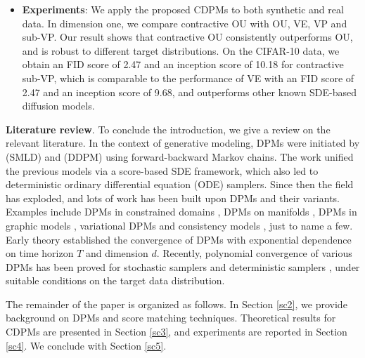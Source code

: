 \documentclass[letterpaper,11pt,reqno]{amsart}
\numberwithin{equation}{section}
\begin{document}
\begin{itemize}[itemsep = 3 pt]
\begin{equation*}
\underbrace{(\small \mbox{noise inaccuracy}) \cdot e^{-T}}_{\tiny \mbox{initialization error}}  + \underbrace{(\small \mbox{score mismatch}) \cdot (1 - e^{-T})}_{\tiny \mbox{score error}} 
+ \underbrace{\texttt{Poly}(\small \mbox{step size})}_{\tiny \mbox{discretization error}}.
\end{equation*}
Score matching is often trained using blackbox function approximations,
and the errors incurred in this step may be large. 
So CDPMs are designed to be robust to score mismatch
and discretization,
at the cost of possible initialization bias.
\item
{\bf Experiments}: We apply the proposed CDPMs to both synthetic and real data. 
In dimension one, 
we compare contractive OU with
OU, VE, VP and sub-VP.
Our result shows that contractive OU consistently outperforms OU,
and is robust to different target distributions.
On the CIFAR-10 data, we obtain an FID score of 2.47 
and an inception score of 10.18 for contractive sub-VP,
which is comparable to the performance of VE with an FID score of 2.47
and an inception score of 9.68,
and outperforms other known SDE-based diffusion models.
\end{itemize}
 
\smallskip
\noindent
{\bf Literature review}.
To conclude the introduction,
we give a review on the relevant literature. 
In the context of generative modeling, 
DPMs were initiated by \cite{Song19} (SMLD) and \cite{Ho20} (DDPM)
using forward-backward Markov chains.
The work \cite{Song20, Song21} unified the previous models 
via a score-based SDE framework,
which also led to deterministic ordinary differential equation (ODE) samplers.
Since then the field has exploded, 
and lots of work has been built upon DPMs and their variants.
Examples include 
DPMs in constrained domains \cite{FK23, LE23, RDD22, DS22},
DPMs on manifolds \cite{Pid22, DeB22, CH23},
DPMs in graphic models \cite{Mei23},
variational DPMs \cite{Kingma21, VK21}
and consistency models \cite{SDC23},
just to name a few.
Early theory \cite{DV21, DeB22, KW22} established the convergence 
of DPMs with exponential dependence on time horizon $T$
and dimension $d$.
Recently, polynomial convergence of various DPMs has been proved
for stochastic samplers \cite{Chen23, Ben23a, LW23, GNZ23, LLT22, LLT23}
and deterministic samplers \cite{Ben23b, Chen23b, Chen23c, LW23},
under suitable conditions on the target data distribution. 

\medskip
\quad The remainder of the paper is organized as follows.
In Section \ref{sc2}, we provide background on DPMs and score matching techniques.
Theoretical results for CDPMs are presented in Section \ref{sc3},
and experiments are reported in Section \ref{sc4}.
We conclude with Section \ref{sc5}.
\end{document}
